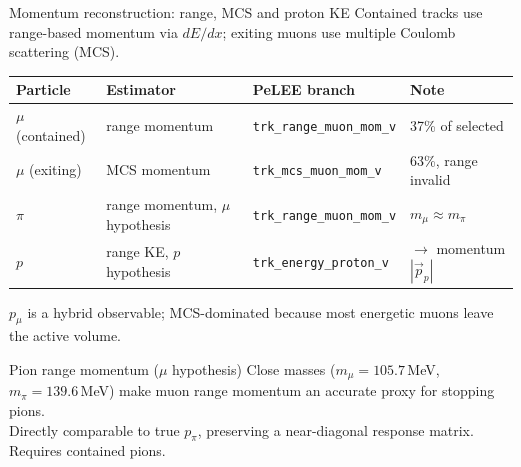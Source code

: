 \documentclass[aspectratio=169,10pt]{beamer}
\begin{document}
\begin{frame}{Momentum reconstruction: range, MCS and proton KE}
  \footnotesize
  Contained tracks use \alert{range-based momentum} via $dE/dx$; exiting muons use \alert{multiple Coulomb scattering (MCS)}.
  \begin{center}\scriptsize
  \begin{tabular}{llll}
  \toprule
  Particle & Estimator & PeLEE branch & Note\\\midrule
  $\mu$ (contained) & range momentum & \texttt{trk\_range\_muon\_mom\_v} & \alert{37\%} of selected\\
  $\mu$ (exiting)   & MCS momentum   & \texttt{trk\_mcs\_muon\_mom\_v}   & \alert{63\%}, range invalid\\
  $\pi$             & range momentum, \alert{$\mu$ hypothesis} & \texttt{trk\_range\_muon\_mom\_v} & $m_\mu \approx m_\pi$\\
  $p$               & range \alert{KE}, $p$ hypothesis & \texttt{trk\_energy\_proton\_v} & $\to$ momentum $|\vec p_p|$\\
  \bottomrule
  \end{tabular}
  \end{center}
  {\scriptsize $p_\mu$ is a \alert{hybrid} observable; MCS-dominated because most energetic muons leave the active volume.}\\[1mm]
  \begin{block}{Pion range momentum ($\mu$ hypothesis)}\scriptsize
  Close masses ($m_\mu=105.7$\,MeV, $m_\pi=139.6$\,MeV) make muon range momentum an accurate proxy for stopping pions.\\[1mm]
  Directly comparable to true $p_\pi$, preserving a near-diagonal response matrix. Requires contained pions.
  \end{block}
\end{frame}
\end{document}
